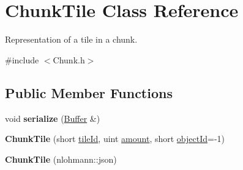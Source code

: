 \hypertarget{classChunkTile}{\section{Chunk\-Tile Class Reference}
\label{classChunkTile}
}


Representation of a tile in a chunk.  




{\ttfamily \#include $<$Chunk.\-h$>$}

\subsection*{Public Member Functions}
\begin{DoxyCompactItemize}
\item 
\hypertarget{classChunkTile_a22837ff1a9d7967e86a64c7664eb53d8}{void {\bfseries serialize} (\hyperlink{classBuffer}{Buffer} \&)}\label{classChunkTile_a22837ff1a9d7967e86a64c7664eb53d8}

\item 
\hypertarget{classChunkTile_a491d6a1986afbe0f283db6b2d8f5ff71}{{\bfseries Chunk\-Tile} (short \hyperlink{classChunkTile_ac7277fa1d196411449a646d3eed73b39}{tile\-Id}, uint \hyperlink{classChunkTile_a29ac3a16c7075941a5c483f1a3372364}{amount}, short \hyperlink{classChunkTile_af7c87e439222b62f7dbf791804c52381}{object\-Id}=-\/1)}\label{classChunkTile_a491d6a1986afbe0f283db6b2d8f5ff71}

\item 
\hypertarget{classChunkTile_a00633aab2a6285d570f880e4cb216831}{{\bfseries Chunk\-Tile} (nlohmann\-::json)}\label{classChunkTile_a00633aab2a6285d570f880e4cb216831}

\end{DoxyCompactItemize}
